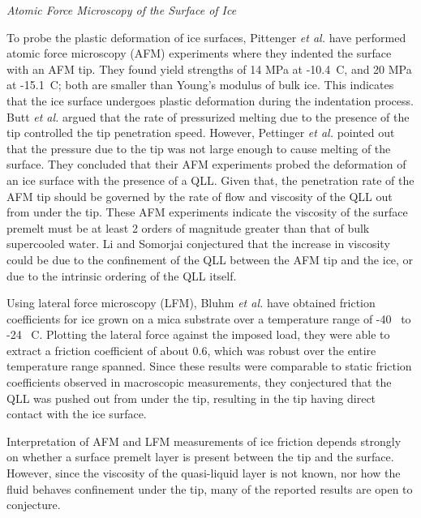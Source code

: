 \begin{flushleft}
\textit{Atomic Force Microscopy of the Surface of Ice}
\end{flushleft}

To probe the plastic deformation of ice surfaces, Pittenger \textit{et
  al.} have performed atomic force microscopy (AFM) experiments where
they indented the surface with an AFM tip.\cite{Butt2000,
  Pittenger2001,Bluhm2000} They found yield strengths of 14 MPa at
-10.4\degree~C, and 20 MPa at -15.1\degree~C; both are smaller than
Young's modulus of bulk ice. This indicates that the ice surface
undergoes plastic deformation during the indentation process. Butt
\textit{et al.}  argued that the rate of pressurized melting due to
the presence of the tip controlled the tip penetration
speed.\cite{Butt2000} However, Pettinger \textit{et al.} pointed out
that the pressure due to the tip was not large enough to cause melting
of the surface.\cite{Pittenger2001} They concluded that their AFM
experiments probed the deformation of an ice surface with the presence
of a QLL. Given that, the penetration rate of the AFM tip should be
governed by the rate of flow and viscosity of the QLL out from under
the tip. These AFM experiments indicate the viscosity of the surface
premelt must be at least 2 orders of magnitude greater than that of
bulk supercooled water. Li and Somorjai conjectured that the increase
in viscosity could be due to the confinement of the QLL between the
AFM tip and the ice, or due to the intrinsic ordering of the QLL
itself.\cite{Li2007}

Using lateral force microscopy (LFM), Bluhm \textit{et al.} have
obtained friction coefficients for ice grown on a mica substrate over
a temperature range of -40\degree~ to -24\degree~ C.\cite{Bluhm2000}
Plotting the lateral force against the imposed load, they were able to
extract a friction coefficient of about 0.6, which was robust over the
entire temperature range spanned. Since these results were comparable
to static friction coefficients observed in macroscopic measurements,
they conjectured that the QLL was pushed out from under the tip,
resulting in the tip having direct contact with the ice surface. 

Interpretation of AFM and LFM measurements of ice friction depends
strongly on whether a surface premelt layer is present between the tip
and the surface. However, since the viscosity of the quasi-liquid
layer is not known, nor how the fluid behaves confinement under the
tip, many of the reported results are open to conjecture.







